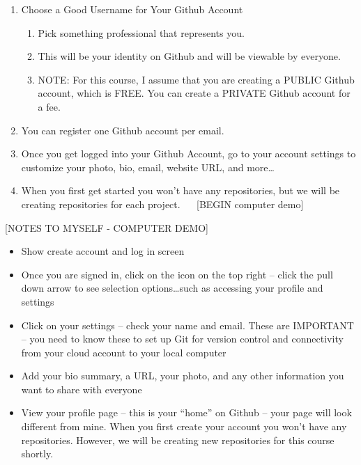 \documentclass[
]{book}
\providecommand{\tightlist}{%
  \setlength{\itemsep}{0pt}\setlength{\parskip}{0pt}}
\begin{document}
\begin{enumerate}
\def\labelenumi{\arabic{enumi}.}
\item
  Choose a Good Username for Your Github Account

  \begin{enumerate}
  \def\labelenumii{\alph{enumii}.}
  \tightlist
  \item
    Pick something professional that represents you.
  \item
    This will be your identity on Github and will be viewable by everyone.
  \item
    NOTE: For this course, I assume that you are creating a PUBLIC Github account, which is FREE. You can create a PRIVATE Github account for a fee.
  \end{enumerate}
\item
  You can register one Github account per email.
\item
  Once you get logged into your Github Account, go to your account settings to customize your photo, bio, email, website URL, and more\ldots{}
\item
  When you first get started you won't have any repositories, but we will be creating repositories for each project.
   
  {[}BEGIN computer demo{]}
\end{enumerate}

{[}NOTES TO MYSELF - COMPUTER DEMO{]}

\begin{itemize}
\tightlist
\item
  Show create account and log in screen
\item
  Once you are signed in, click on the icon on the top right -- click the pull down arrow to see selection options\ldots such as accessing your profile and settings
\item
  Click on your settings -- check your name and email. These are IMPORTANT -- you need to know these to set up Git for version control and connectivity from your cloud account to your local computer
\item
  Add your bio summary, a URL, your photo, and any other information you want to share with everyone
\item
  View your profile page -- this is your ``home'' on Github -- your page will look different from mine. When you first create your account you won't have any repositories. However, we will be creating new repositories for this course shortly.
\end{itemize}
\end{document}
